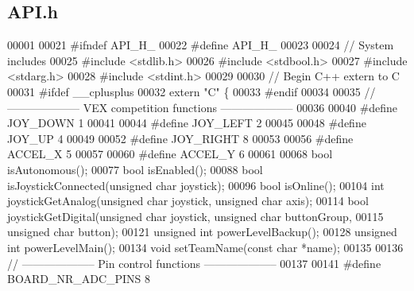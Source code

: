 \subsection{A\+P\+I.\+h}
\label{_a_p_i_8h_source}

\begin{DoxyCode}
00001 
00021 \textcolor{preprocessor}{#ifndef API\_H\_}
00022 \textcolor{preprocessor}{#define API\_H\_}
00023 
00024 \textcolor{comment}{// System includes}
00025 \textcolor{preprocessor}{#include <stdlib.h>}
00026 \textcolor{preprocessor}{#include <stdbool.h>}
00027 \textcolor{preprocessor}{#include <stdarg.h>}
00028 \textcolor{preprocessor}{#include <stdint.h>}
00029 
00030 \textcolor{comment}{// Begin C++ extern to C}
00031 \textcolor{preprocessor}{#ifdef \_\_cplusplus}
00032 \textcolor{keyword}{extern} \textcolor{stringliteral}{"C"} \{
00033 \textcolor{preprocessor}{#endif}
00034 
00035 \textcolor{comment}{// -------------------- VEX competition functions --------------------}
00036 
00040 \textcolor{preprocessor}{#define JOY\_DOWN 1}
00041 
00044 \textcolor{preprocessor}{#define JOY\_LEFT 2}
00045 
00048 \textcolor{preprocessor}{#define JOY\_UP 4}
00049 
00052 \textcolor{preprocessor}{#define JOY\_RIGHT 8}
00053 
00056 \textcolor{preprocessor}{#define ACCEL\_X 5}
00057 
00060 \textcolor{preprocessor}{#define ACCEL\_Y 6}
00061 
00068 \textcolor{keywordtype}{bool} isAutonomous();
00077 \textcolor{keywordtype}{bool} isEnabled();
00088 \textcolor{keywordtype}{bool} isJoystickConnected(\textcolor{keywordtype}{unsigned} \textcolor{keywordtype}{char} joystick);
00096 \textcolor{keywordtype}{bool} isOnline();
00104 \textcolor{keywordtype}{int} joystickGetAnalog(\textcolor{keywordtype}{unsigned} \textcolor{keywordtype}{char} joystick, \textcolor{keywordtype}{unsigned} \textcolor{keywordtype}{char} axis);
00114 \textcolor{keywordtype}{bool} joystickGetDigital(\textcolor{keywordtype}{unsigned} \textcolor{keywordtype}{char} joystick, \textcolor{keywordtype}{unsigned} \textcolor{keywordtype}{char} buttonGroup,
00115     \textcolor{keywordtype}{unsigned} \textcolor{keywordtype}{char} button);
00121 \textcolor{keywordtype}{unsigned} \textcolor{keywordtype}{int} powerLevelBackup();
00128 \textcolor{keywordtype}{unsigned} \textcolor{keywordtype}{int} powerLevelMain();
00134 \textcolor{keywordtype}{void} setTeamName(\textcolor{keyword}{const} \textcolor{keywordtype}{char} *name);
00135 
00136 \textcolor{comment}{// -------------------- Pin control functions --------------------}
00137 
00141 \textcolor{preprocessor}{#define BOARD\_NR\_ADC\_PINS 8}

\end{DoxyCode}
